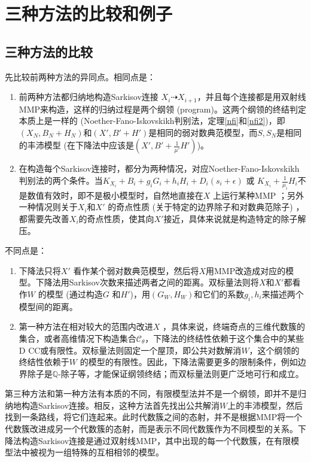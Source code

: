 \chapter{三种方法的比较和例子}

\section{三种方法的比较}
先比较前两种方法的异同点。相同点是：
\begin{enumerate}
  \item 前两种方法都归纳地构造Sarkisov连接 $X_{i} \dashrightarrow X_{i+1}$，并且每个连接都是用双射线MMP来构造，这样的归纳过程是两个纲领 (program)。这两个纲领的终结判定本质上是一样的 (Noether-Fano-Iskovskikh判别法，定理\ref{nfi}和\ref{nfi2})，即$(X_{N}, B_{N}+H_{N})$和$(X',B'+H')$是相同的弱对数典范模型，而$S,S_{N}$是相同的丰沛模型 (在下降法中应该是$(X',B'+ \frac{1}{\mu'}H')$)。
  \item 在构造每个Sarkisov连接时，都分为两种情况，对应Noether-Fano-Iskovskikh判别法的两个条件。当$K_{X_{i}}+B_{i}+g_{i}G_{i}+h_{i}H_{i}+D_{i}(s_{i}+\epsilon)$ 或 $K_{X_{i}}+ \frac{1}{\mu_{i}}H_{i}$不是数值有效时，即不是极小模型时，自然地直接在$X$ 上运行某种MMP ；另外一种情况则关于$X_{i}$和$X'$ 的奇点性质 (关于特定的边界除子和对数典范除子) ，都需要先改善$X_{i}$的奇点性质，使其向$X'$接近，具体来说就是构造特定的除子解压。 
\end{enumerate}
不同点是：
\begin{enumerate}
  \item 下降法只将$X'$ 看作某个弱对数典范模型，然后将$X$用MMP改造成对应的模型。下降法用Sarkisov次数来描述两者之间的距离。双标量法则将$X$和$X'$都看作$W$ 的模型 (通过构造$G$ 和$H'$)，用$(G_{W},H_{W})$和它们的系数$g_{i},h_{i}$来描述两个模型间的距离。
  \item 第一种方法在相对较大的范围内改进$X$ ，具体来说，终端奇点的三维代数簇的集合，或者高维情况下构造集合$\mathcal{C}_{\theta}$，下降法的终结性依赖于这个集合中的某些D CC或有限性。双标量法则固定一个屋顶，即公共对数解消$W$，这个纲领的终结性依赖于$W$ 的模型的有限性。因此，下降法需要更多的限制条件，例如边界除子是$\mathbb{Q}$-除子等，才能保证纲领终结；而双标量法则更广泛地可行和成立。  
\end{enumerate}

第三种方法和第一种方法有本质的不同，有限模型法并不是一个纲领，即并不是归纳地构造Sarkisov连接。相反，这种方法首先找出公共解消$W$上的丰沛模型，然后找到一条路线，将它们连起来。此时代数簇之间的态射，并不是根据MMP将一个代数簇改进成另一个代数簇的态射，而是表示不同代数簇作为不同模型的关系。下降法构造Sarkisov连接是通过双射线MMP，其中出现的每一个代数簇，在有限模型法中被视为一组特殊的互相相邻的模型。
